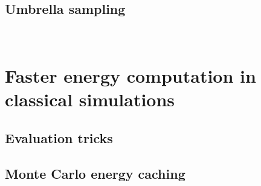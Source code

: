 \documentclass[thesis]{subfiles}
\begin{document}
\subsection{Umbrella sampling}
~


\section{Faster energy computation in classical simulations}

\subsection{Evaluation tricks}



\subsection{Monte Carlo energy caching}


\OnlyInSubfile{\printbibliography}
\end{document}
